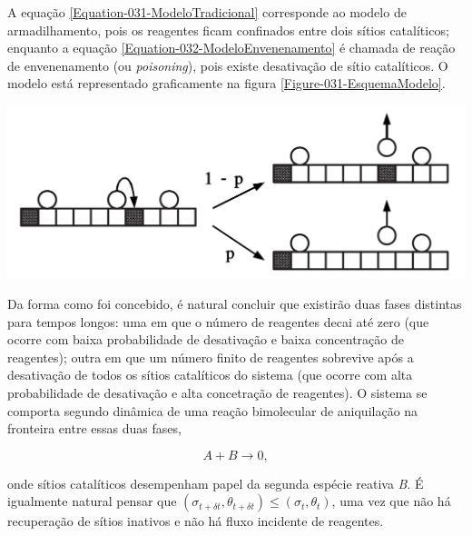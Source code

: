 A equação \ref{Equation-031-ModeloTradicional} corresponde ao modelo de armadilhamento, pois
os reagentes ficam confinados entre dois sítios catalíticos; enquanto a equação
\ref{Equation-032-ModeloEnvenenamento} é chamada de reação de envenenamento (ou
\textit{poisoning}), pois existe desativação de sítio catalíticos. O modelo está
representado graficamente na figura \ref{Figure-031-EsquemaModelo}.

{
  \centering
  \captionsetup{type=figure}
	\includegraphics[width=\columnwidth]{./figures/031-EsquemaModelo.png}
	\label{Figure-031-EsquemaModelo}
}

Da forma como foi concebido, é natural concluir que existirão duas fases
distintas para tempos longos: uma em que o número de reagentes decai até zero
(que ocorre com baixa probabilidade de desativação e baixa concentração de
reagentes); outra em que um número finito de reagentes sobrevive após a
desativação de todos os sítios catalíticos do sistema (que ocorre com alta
probabilidade de desativação e alta concetração de reagentes). O sistema se
comporta segundo dinâmica de uma reação bimolecular de aniquilação na fronteira
entre essas duas fases,

{
\setlength{\belowdisplayskip}{0pt} \setlength{\belowdisplayshortskip}{0pt}
\setlength{\abovedisplayskip}{0pt} \setlength{\abovedisplayshortskip}{0pt}

\begin{equation}
  A + B \longrightarrow 0,
  \label{Equation-032-ModeloBimolecular}
\end{equation}
}

\noindent onde sítios catalíticos desempenham papel da segunda espécie reativa
\textit{B}. É igualmente natural pensar que $(\sigma_{t+\delta t},
\theta_{t+\delta t}) \leq (\sigma_t, \theta_t)$, uma vez que não há recuperação
de sítios inativos e não há fluxo incidente de reagentes.
